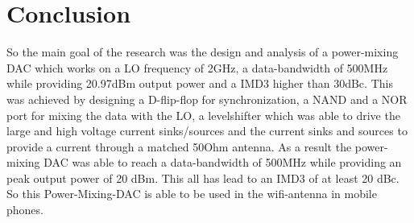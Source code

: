 \section{Conclusion}\label{sec:conclusion}
So the main goal of the research was the design and analysis of a power-mixing DAC which works on a LO frequency of 2GHz, a data-bandwidth of 500MHz while providing 20.97dBm output power and a IMD3 higher than 30dBc. This was achieved by designing a D-flip-flop for synchronization, a NAND and a NOR port for mixing the data with the LO, a levelshifter which was able to drive the large and high voltage current sinks/sources and the current sinks and sources to provide a current through a matched 50Ohm antenna. As a result the power-mixing DAC was able to reach a data-bandwidth of 500MHz while providing an peak output power of 20 dBm. This all has lead to an IMD3 of at least 20 dBc. So this Power-Mixing-DAC is able to be used in the wifi-antenna in mobile phones. 